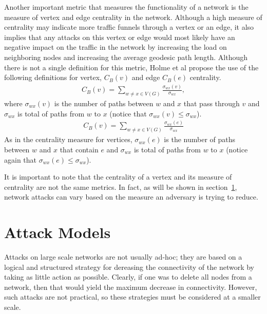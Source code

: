 \documentclass[doc]{apa}%
\begin{document}
Another important metric that measures the functionality of a network is the measure of vertex and edge centrality in the network. Although a high measure of centrality may indicate more traffic funnels through a vertex or an edge, it also implies that any attacks on this vertex or edge would most likely have an negative impact on the traffic in the network by increasing the load on neighboring nodes and increasing the average geodesic path length. Although there is not a single definition for this metric, Holme et al \cite{Attacks} propose the use of the following definitions for vertex, $C_{B}(v)$ and edge $C_{B}(e)$ centrality.
\begin{eqnarray*}
C_{B}(v) = \sum_{w \not= x \in V(G)} \frac{\sigma_{wx}(v)}{\sigma_{wx}},
\end{eqnarray*}
where $\sigma_{wx}(v)$ is the number of paths between $w$ and $x$ that pass through $v$ and $\sigma_{wx}$ is total of paths from $w$ to $x$ (notice that $\sigma_{wx}(v) \leq \sigma_{wx}$).
\begin{eqnarray*}
C_{B}(v) = \sum_{w \not= x \in V(G)} \frac{\sigma_{wx}(e)}{\sigma_{wx}}
\end{eqnarray*}
As in the centrality measure for vertices, $\sigma_{wx}(e)$ is the number of paths between $w$ and $x$ that contain $e$ and $\sigma_{wx}$ is total of paths from $w$ to $x$ (notice again that $\sigma_{wx}(e) \leq \sigma_{wx}$).

It is important to note that the centrality of a vertex and its measure of centrality are not the same metrics. In fact, as will be shown in section~\ref{AttackStrategies}, network attacks can vary based on the measure an adversary is trying to reduce. 




\section{Attack Models}
\label{AttackStrategies}
Attacks on large scale networks are not usually ad-hoc; they are based on a logical and structured strategy for dereasing the connectivity of the network by taking as little action as possible. Clearly, if one was to delete all nodes from a network, then that would yield the maximum decrease in connectivity. However, such attacks are not practical, so these strategies must be considered at a smaller scale. 
\end{document}
